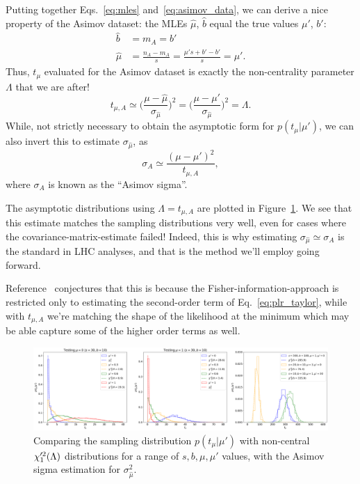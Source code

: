 Putting together Eqs.~\ref{eq:mles} and~\ref{eq:asimov_data}, we can derive a nice property of the Asimov dataset: the MLEs $\hat\mu$, $\hat b$ equal the true values $\mu'$, $b'$:
\begin{align}
    \hat b &= m_A = b' \\
    \hat \mu &= \frac{n_A - m_A}{s} = \frac{\mu's + b' - b'}{s} = \mu'.
\label{eq:asimov_mles}
\end{align}
Thus, $t_\mu$ evaluated for the Asimov dataset is exactly the non-centrality parameter $\Lambda$ that we are after!
\begin{equation}
    t_{\mu, A} \simeq \bigg (\frac{\mu-\hat\mu}{\sigma_{\hat\mu}}\bigg)^2 = \bigg (\frac{\mu-\mu'}{\sigma_{\hat\mu}}\bigg)^2 = \Lambda.
\label{eq:tmuasimov}
\end{equation}
While, not strictly necessary to obtain the asymptotic form for $p(t_\mu|\mu')$, we can also invert this to estimate $\sigma_{\hat\mu}$, as
\begin{equation}
    \sigma_A \simeq \frac{(\mu-\mu')^2}{t_{\mu, A}},
\label{eq:asimov_sigma}
\end{equation}
where $\sigma_A$ is known as the ``Asimov sigma''.

The asymptotic distributions using $\Lambda = t_{\mu, A}$ are plotted in Figure~\ref{fig:ptmu_asym2}.
We see that this estimate matches the sampling distributions very well, even for cases where the covariance-matrix-estimate failed!
Indeed, this is why estimating $\sigma_{\hat\mu} \simeq \sigma_A$ is the standard in LHC analyses, and that is the method we'll employ going forward.

Reference~\cite{Cowan:2010js} conjectures that this is because the Fisher-information-approach is restricted only to estimating the second-order term of Eq.~\ref{eq:plr_taylor}, while with $t_{\mu, A}$ we're matching the shape of the likelihood at the minimum which may be able capture some of the higher order terms as well.

\begin{figure}[htb]
  \centering
  \includegraphics[width=\textwidth]{figures/06-asymptotic-plr/3.png}
  \caption{Comparing the sampling distribution $p(t_\mu|\mu')$ with non-central $\chi^{\prime 2}_1(\Lambda)$ distributions for a range of $s, b, \mu, \mu'$ values, with the Asimov sigma estimation for $\sigma^2_{\hat\mu}$.}
  \label{fig:ptmu_asym2}
\end{figure}


